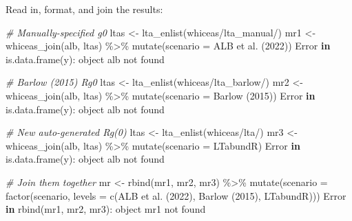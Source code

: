 \documentclass[
]{book}
\newenvironment{Shaded}{\begin{snugshade}}{\end{snugshade}}
\newcommand{\AttributeTok}[1]{\textcolor[rgb]{0.77,0.63,0.00}{#1}}
\newcommand{\CommentTok}[1]{\textcolor[rgb]{0.56,0.35,0.01}{\textit{#1}}}
\newcommand{\ControlFlowTok}[1]{\textcolor[rgb]{0.13,0.29,0.53}{\textbf{#1}}}
\newcommand{\FunctionTok}[1]{\textcolor[rgb]{0.00,0.00,0.00}{#1}}
\newcommand{\NormalTok}[1]{#1}
\newcommand{\OtherTok}[1]{\textcolor[rgb]{0.56,0.35,0.01}{#1}}
\newcommand{\SpecialCharTok}[1]{\textcolor[rgb]{0.00,0.00,0.00}{#1}}
\newcommand{\StringTok}[1]{\textcolor[rgb]{0.31,0.60,0.02}{#1}}
\begin{document}
Read in, format, and join the results:

\begin{Shaded}
\begin{Highlighting}[]
\CommentTok{\# Manually{-}specified g0}
\NormalTok{ltas }\OtherTok{\textless{}{-}} \FunctionTok{lta\_enlist}\NormalTok{(}\StringTok{\textquotesingle{}whiceas/lta\_manual/\textquotesingle{}}\NormalTok{)}
\NormalTok{mr1 }\OtherTok{\textless{}{-}} \FunctionTok{whiceas\_join}\NormalTok{(alb, ltas) }\SpecialCharTok{\%\textgreater{}\%} \FunctionTok{mutate}\NormalTok{(}\AttributeTok{scenario =} \StringTok{\textquotesingle{}ALB et al. (2022)\textquotesingle{}}\NormalTok{)}
\NormalTok{Error }\ControlFlowTok{in} \FunctionTok{is.data.frame}\NormalTok{(y)}\SpecialCharTok{:}\NormalTok{ object }\StringTok{\textquotesingle{}alb\textquotesingle{}}\NormalTok{ not found}

\CommentTok{\# Barlow (2015) Rg0}
\NormalTok{ltas }\OtherTok{\textless{}{-}} \FunctionTok{lta\_enlist}\NormalTok{(}\StringTok{\textquotesingle{}whiceas/lta\_barlow/\textquotesingle{}}\NormalTok{)}
\NormalTok{mr2 }\OtherTok{\textless{}{-}} \FunctionTok{whiceas\_join}\NormalTok{(alb, ltas) }\SpecialCharTok{\%\textgreater{}\%} \FunctionTok{mutate}\NormalTok{(}\AttributeTok{scenario =} \StringTok{\textquotesingle{}Barlow (2015)\textquotesingle{}}\NormalTok{)}
\NormalTok{Error }\ControlFlowTok{in} \FunctionTok{is.data.frame}\NormalTok{(y)}\SpecialCharTok{:}\NormalTok{ object }\StringTok{\textquotesingle{}alb\textquotesingle{}}\NormalTok{ not found}

\CommentTok{\# New auto{-}generated Rg(0)}
\NormalTok{ltas }\OtherTok{\textless{}{-}} \FunctionTok{lta\_enlist}\NormalTok{(}\StringTok{\textquotesingle{}whiceas/lta/\textquotesingle{}}\NormalTok{)}
\NormalTok{mr3 }\OtherTok{\textless{}{-}} \FunctionTok{whiceas\_join}\NormalTok{(alb, ltas) }\SpecialCharTok{\%\textgreater{}\%} \FunctionTok{mutate}\NormalTok{(}\AttributeTok{scenario =} \StringTok{\textquotesingle{}LTabundR\textquotesingle{}}\NormalTok{)}
\NormalTok{Error }\ControlFlowTok{in} \FunctionTok{is.data.frame}\NormalTok{(y)}\SpecialCharTok{:}\NormalTok{ object }\StringTok{\textquotesingle{}alb\textquotesingle{}}\NormalTok{ not found}

\CommentTok{\# Join them together}
\NormalTok{mr }\OtherTok{\textless{}{-}} \FunctionTok{rbind}\NormalTok{(mr1, mr2, mr3) }\SpecialCharTok{\%\textgreater{}\%} 
  \FunctionTok{mutate}\NormalTok{(}\AttributeTok{scenario =} \FunctionTok{factor}\NormalTok{(scenario, }\AttributeTok{levels =} \FunctionTok{c}\NormalTok{(}\StringTok{\textquotesingle{}ALB et al. (2022)\textquotesingle{}}\NormalTok{,}
                                                \StringTok{\textquotesingle{}Barlow (2015)\textquotesingle{}}\NormalTok{,}
                                                \StringTok{\textquotesingle{}LTabundR\textquotesingle{}}\NormalTok{)))}
\NormalTok{Error }\ControlFlowTok{in} \FunctionTok{rbind}\NormalTok{(mr1, mr2, mr3)}\SpecialCharTok{:}\NormalTok{ object }\StringTok{\textquotesingle{}mr1\textquotesingle{}}\NormalTok{ not found}
\end{Highlighting}
\end{Shaded}
\end{document}
